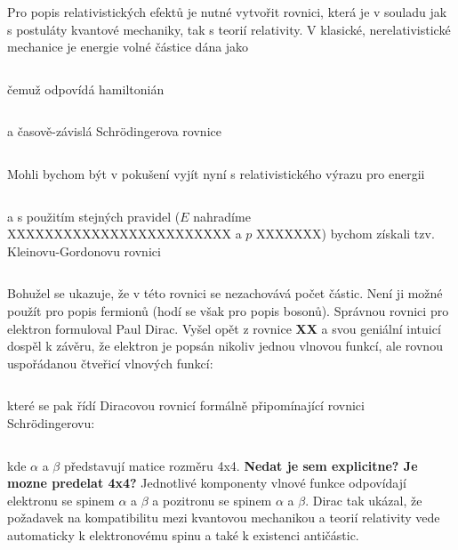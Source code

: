 Pro popis relativistických efektů je nutné vytvořit rovnici, která je v souladu jak s postuláty kvantové mechaniky, tak s teorií relativity. V klasické, nerelativistické mechanice je energie volné částice dána jako

\begin{equation}
\label{rov:XXX}
\end{equation}
  
  
\noindent čemuž odpovídá hamiltonián 

\begin{equation}
\label{rov:XXX}
\end{equation}

\noindent a časově-závislá Schr\"odingerova rovnice 

\begin{equation}
\label{rov:XXX}
\end{equation}

Mohli bychom být v pokušení vyjít nyní s relativistického výrazu pro energii

\begin{equation}
\label{rov:XXX}
\end{equation}

\noindent a s použitím stejných pravidel ($E$ nahradíme XXXXXXXXXXXXXXXXXXXXXXXX a $p$ XXXXXXX) bychom získali tzv. Kleinovu-Gordonovu rovnici

\begin{equation}
\label{rov:XXX}
\end{equation}

Bohužel se ukazuje, že v této rovnici se nezachovává počet částic. Není ji možné použít pro popis fermionů (hodí se však pro popis bosonů). Správnou rovnici pro elektron formuloval Paul Dirac. Vyšel opět z rovnice \textbf{XX} a svou geniální intuicí dospěl k závěru, že elektron je popsán nikoliv jednou vlnovou funkcí, ale rovnou uspořádanou čtveřicí vlnových funkcí:

\begin{equation}
\label{rov:XXX}
\end{equation}

\noindent které se pak řídí Diracovou rovnicí formálně připomínající rovnici Schr\"odingerovu:

\begin{equation}
\label{rov:XXX}
\end{equation}

\noindent kde $\alpha$ a $\beta$ představují matice rozměru 4x4. \textbf{Nedat je sem explicitne? Je mozne predelat 4x4?}  Jednotlivé komponenty vlnové funkce odpovídají elektronu se spinem $\alpha$ a $\beta$ a pozitronu se spinem $\alpha$ a $\beta$. Dirac tak ukázal, že požadavek na kompatibilitu mezi kvantovou mechanikou a teorií relativity vede automaticky k elektronovému spinu a také k existenci antičástic.  
    
